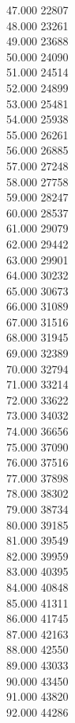 { 47.000	22807 \\
 48.000	23261 \\
 49.000	23688 \\
 50.000	24090 \\
 51.000	24514 \\
 52.000	24899 \\
 53.000	25481 \\
 54.000	25938 \\
 55.000	26261 \\
 56.000	26885 \\
 57.000	27248 \\
 58.000	27758 \\
 59.000	28247 \\
 60.000	28537 \\
 61.000	29079 \\
 62.000	29442 \\
 63.000	29901 \\
 64.000	30232 \\
 65.000	30673 \\
 66.000	31089 \\
 67.000	31516 \\
 68.000	31945 \\
 69.000	32389 \\
 70.000	32794 \\
 71.000	33214 \\
 72.000	33622 \\
 73.000	34032 \\
 74.000	36656 \\
 75.000	37090 \\
 76.000	37516 \\
 77.000	37898 \\
 78.000	38302 \\
 79.000	38734 \\
 80.000	39185 \\
 81.000	39549 \\
 82.000	39959 \\
 83.000	40395 \\
 84.000	40848 \\
 85.000	41311 \\
 86.000	41745 \\
 87.000	42163 \\
 88.000	42550 \\
 89.000	43033 \\
 90.000	43450 \\
 91.000	43820 \\
 92.000	44286 \\
}
